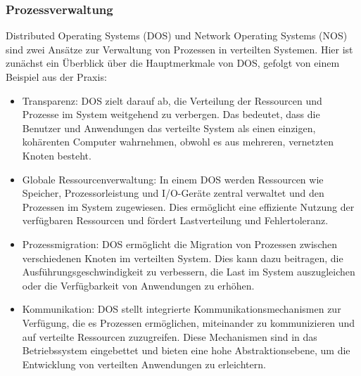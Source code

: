 \documentclass[../vs-script-first-v01.tex]{subfiles}
\begin{document}
\subsubsection{Prozessverwaltung}
Distributed Operating Systems (DOS) und Network Operating Systems (NOS) sind zwei Ansätze zur Verwaltung von Prozessen in verteilten Systemen. Hier ist zunächst ein Überblick über die Hauptmerkmale von DOS, gefolgt von einem Beispiel aus der Praxis:
\begin{itemize}
\item Transparenz: DOS zielt darauf ab, die Verteilung der Ressourcen und Prozesse im System weitgehend zu verbergen. Das bedeutet, dass die Benutzer und Anwendungen das verteilte System als einen einzigen, kohärenten Computer wahrnehmen, obwohl es aus mehreren, vernetzten Knoten besteht.
\item Globale Ressourcenverwaltung: In einem DOS werden Ressourcen wie Speicher, Prozessorleistung und I/O-Geräte zentral verwaltet und den Prozessen im System zugewiesen. Dies ermöglicht eine effiziente Nutzung der verfügbaren Ressourcen und fördert Lastverteilung und Fehlertoleranz.
\item Prozessmigration: DOS ermöglicht die Migration von Prozessen zwischen verschiedenen Knoten im verteilten System. Dies kann dazu beitragen, die Ausführungsgeschwindigkeit zu verbessern, die Last im System auszugleichen oder die Verfügbarkeit von Anwendungen zu erhöhen.
\item Kommunikation: DOS stellt integrierte Kommunikationsmechanismen zur Verfügung, die es Prozessen ermöglichen, miteinander zu kommunizieren und auf verteilte Ressourcen zuzugreifen. Diese Mechanismen sind in das Betriebssystem eingebettet und bieten eine hohe Abstraktionsebene, um die Entwicklung von verteilten Anwendungen zu erleichtern.
\end{itemize}
\end{document}
